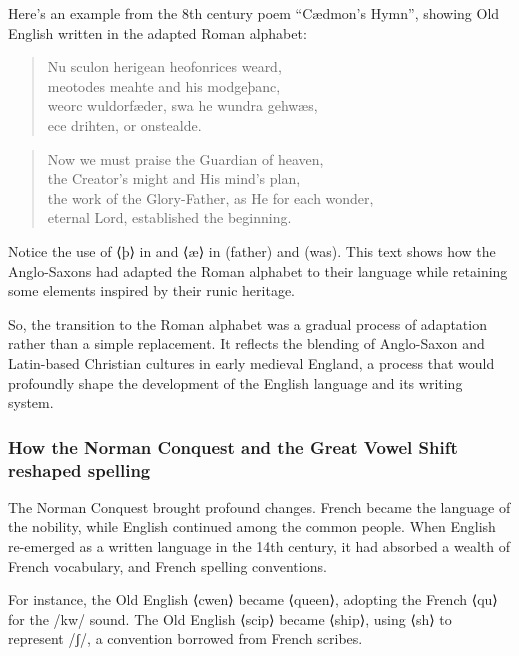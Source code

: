 Here's an example from the 8th century poem ``Cædmon's Hymn'', showing Old English written in the adapted Roman alphabet:

\begin{quote}
Nu sculon herigean heofonrices weard,\\
meotodes meahte and his modgeþanc,\\
weorc wuldorfæder, swa he wundra gehwæs,\\
ece drihten, or onstealde.
\end{quote}

\begin{quote}
    Now we must praise the Guardian of heaven,\\
    the Creator's might and His mind's plan,\\
    the work of the Glory-Father, as He for each wonder,\\
    eternal Lord, established the beginning.
\end{quote}

Notice the use of ⟨þ⟩ in  and ⟨æ⟩ in  (father) and  (was). This text shows how the Anglo-Saxons had adapted the Roman alphabet to their language while retaining some elements inspired by their runic heritage.

So, the transition to the Roman alphabet was a gradual process of adaptation rather than a simple replacement. It reflects the blending of Anglo-Saxon and Latin-based Christian cultures in early medieval England, a process that would profoundly shape the development of the English language and its writing system.

\subsubsection{How the Norman Conquest and the Great Vowel Shift reshaped spelling}
\label{sec:great-vowel-shift}

The Norman Conquest brought profound changes. French became the language of the nobility, while English continued among the common people. When English re-emerged as a written language in the 14th century, it had absorbed a wealth of French vocabulary, and French spelling conventions.

For instance, the Old English ⟨cwen⟩ became ⟨queen⟩, adopting the French ⟨qu⟩ for the /kw/ sound. The Old English ⟨scip⟩ became ⟨ship⟩, using ⟨sh⟩ to represent /ʃ/, a convention borrowed from French scribes.

